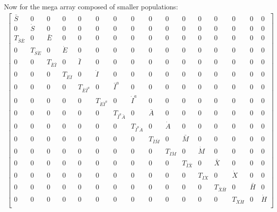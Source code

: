 \documentclass{article}
\begin{document}
Now for the mega array composed of smaller populations:
\begin{eqnarray}
\begin{bmatrix}
\bar{S} & 0 & 0 & 0 & 0 & 0 & 0 & 0 & 0 & 0 & 0 & 0 & 0 & 0 & 0 & 0 \\ 
0 & \dot{S} & 0 & 0 & 0 & 0 & 0 & 0 & 0 & 0 & 0 & 0 & 0 & 0 & 0 & 0 \\ 
T_{\bar{S}\bar{E}} & 0 & \bar{E} & 0 & 0 & 0 & 0 & 0 & 0 & 0 & 0 & 0 & 0 & 0 & 0 & 0 \\ 
0 & T_{\dot{S}\dot{E}} & 0 & \dot{E} & 0 & 0 & 0 & 0 & 0 & 0 & 0 & 0 & 0 & 0 & 0 & 0 \\ 
0 & 0 & T_{\bar{E}\bar{I}} & 0 & \bar{I} & 0 & 0 & 0 & 0 & 0 & 0 & 0 & 0 & 0 & 0 & 0 \\ 
0 & 0 & 0 & T_{\dot{E}\dot{I}} & 0 & \dot{I} & 0 & 0 & 0 & 0 & 0 & 0 & 0 & 0 & 0 & 0 \\ 
0 & 0 & 0 & 0 & T_{\bar{E}\bar{I}^{a}} & 0 & \bar{I}^{a} & 0 & 0 & 0 & 0 & 0 & 0 & 0 & 0 & 0 \\ 
0 & 0 & 0 & 0 & 0 & T_{\dot{E}\dot{I}^{a}} & 0 & \dot{I}^{a} & 0 & 0 & 0 & 0 & 0 & 0 & 0 & 0 \\ 
0 & 0 & 0 & 0 & 0 & 0 & T_{\bar{I}^{a}\bar{A}} & 0 & \bar{A} & 0 & 0 & 0 & 0 & 0 & 0 & 0 \\ 
0 & 0 & 0 & 0 & 0 & 0 & 0 & T_{\dot{I}^{a}\dot{A}} & 0 & \dot{A} & 0 & 0 & 0 & 0 & 0 & 0 \\ 
0 & 0 & 0 & 0 & 0 & 0 & 0 & 0 & T_{\bar{I}\bar{M}} & 0 & \bar{M} & 0 & 0 & 0 & 0 & 0 \\ 
0 & 0 & 0 & 0 & 0 & 0 & 0 & 0 & 0 & T_{\dot{I}\dot{M}} & 0 & \dot{M} & 0 & 0 & 0 & 0 \\ 
0 & 0 & 0 & 0 & 0 & 0 & 0 & 0 & 0 & 0 & T_{\bar{I}\bar{X}} & 0 & \bar{X} & 0 & 0 & 0 \\ 
0 & 0 & 0 & 0 & 0 & 0 & 0 & 0 & 0 & 0 & 0 & T_{\dot{I}\dot{X}} & 0 & \dot{X} & 0 & 0 \\ 
0 & 0 & 0 & 0 & 0 & 0 & 0 & 0 & 0 & 0 & 0 & 0 & T_{\bar{X}\bar{H}} & 0 & \bar{H} & 0 \\ 
0 & 0 & 0 & 0 & 0 & 0 & 0 & 0 & 0 & 0 & 0 & 0 & 0 & T_{\dot{X}\dot{H}} & 0 & \dot{H} \\ 
\end{bmatrix}
\end{eqnarray}
\end{document}
